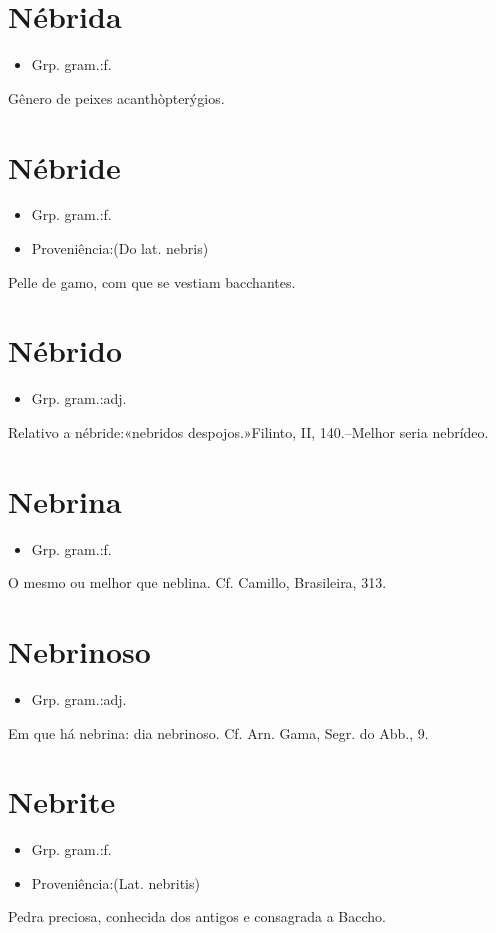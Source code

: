 \section{Nébrida}
\begin{itemize}
\item {Grp. gram.:f.}
\end{itemize}
Gênero de peixes acanthòpterýgios.
\section{Nébride}
\begin{itemize}
\item {Grp. gram.:f.}
\end{itemize}
\begin{itemize}
\item {Proveniência:(Do lat. \textunderscore nebris\textunderscore )}
\end{itemize}
Pelle de gamo, com que se vestiam bacchantes.
\section{Nébrido}
\begin{itemize}
\item {Grp. gram.:adj.}
\end{itemize}
Relativo a nébride:«\textunderscore nebridos despojos.\textunderscore »Filinto, II, 140.--Melhor seria \textunderscore nebrídeo\textunderscore .
\section{Nebrina}
\begin{itemize}
\item {Grp. gram.:f.}
\end{itemize}
O mesmo ou melhor que \textunderscore neblina\textunderscore . Cf. Camillo, \textunderscore Brasileira\textunderscore , 313.
\section{Nebrinoso}
\begin{itemize}
\item {Grp. gram.:adj.}
\end{itemize}
Em que há nebrina: \textunderscore dia nebrinoso\textunderscore . Cf. Arn. Gama, \textunderscore Segr. do Abb.\textunderscore , 9.
\section{Nebrite}
\begin{itemize}
\item {Grp. gram.:f.}
\end{itemize}
\begin{itemize}
\item {Proveniência:(Lat. \textunderscore nebritis\textunderscore )}
\end{itemize}
Pedra preciosa, conhecida dos antigos e consagrada a Baccho.
